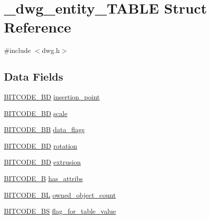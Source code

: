 \hypertarget{struct__dwg__entity__TABLE}{\section{\-\_\-dwg\-\_\-entity\-\_\-\-T\-A\-B\-L\-E \-Struct \-Reference}
\label{struct__dwg__entity__TABLE}
}


{\ttfamily \#include $<$dwg.\-h$>$}

\subsection*{\-Data \-Fields}
\begin{DoxyCompactItemize}
\item 
\hyperlink{dwg_8h_a00698ef1bb072aa0a9360c6fc1c57587}{\-B\-I\-T\-C\-O\-D\-E\-\_\-B\-D} \hyperlink{struct__dwg__entity__TABLE_a4c88710d1dae13b20533374c98b5a812}{insertion\-\_\-point}
\item 
\hyperlink{dwg_8h_a00698ef1bb072aa0a9360c6fc1c57587}{\-B\-I\-T\-C\-O\-D\-E\-\_\-B\-D} \hyperlink{struct__dwg__entity__TABLE_a0ea3293ceac0f3cf5e02673b4d253c63}{scale}
\item 
\hyperlink{dwg_8h_a3d492df0a5def6aa68636113e209241f}{\-B\-I\-T\-C\-O\-D\-E\-\_\-\-B\-B} \hyperlink{struct__dwg__entity__TABLE_ae06b3560f281c228d1770fa6f23062ff}{data\-\_\-flags}
\item 
\hyperlink{dwg_8h_a3c1e6781466b74ba07785d57da70ed97}{\-B\-I\-T\-C\-O\-D\-E\-\_\-\-B\-D} \hyperlink{struct__dwg__entity__TABLE_a88b8f500e08d0e38cc67932e98e8ce07}{rotation}
\item 
\hyperlink{dwg_8h_a00698ef1bb072aa0a9360c6fc1c57587}{\-B\-I\-T\-C\-O\-D\-E\-\_\-B\-D} \hyperlink{struct__dwg__entity__TABLE_aae23774257a20d950cf88942c4a23d39}{extrusion}
\item 
\hyperlink{dwg_8h_ab533b1f62d9086749e3bb5b67e9f224e}{\-B\-I\-T\-C\-O\-D\-E\-\_\-\-B} \hyperlink{struct__dwg__entity__TABLE_a31f76c30465bdc44e38af1a399d40321}{has\-\_\-attribs}
\item 
\hyperlink{dwg_8h_aebd5f127038868cbabc3d55d91da776c}{\-B\-I\-T\-C\-O\-D\-E\-\_\-\-B\-L} \hyperlink{struct__dwg__entity__TABLE_a75d22b0d793b9f47624c40ceec1b954b}{owned\-\_\-object\-\_\-count}
\item 
\hyperlink{dwg_8h_a94297606fbd4a4ff97e8add284af0809}{\-B\-I\-T\-C\-O\-D\-E\-\_\-\-B\-S} \hyperlink{struct__dwg__entity__TABLE_aaa0b90b6a06f4aca7f71541820349cd6}{flag\-\_\-for\-\_\-table\-\_\-value}
\item 

\end{DoxyCompactItemize}
